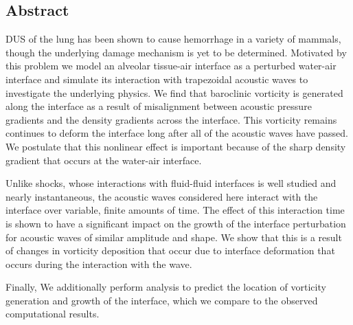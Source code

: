 \begin{center}
  \begin{minipage}{0.8\textwidth}
    \subsection*{Abstract}
    \ac{DUS} of the lung has been shown to cause hemorrhage in a
    variety of mammals, though the underlying damage mechanism is yet
    to be determined. Motivated by this problem we model an alveolar
    tissue-air interface as a perturbed water-air interface and
    simulate its interaction with trapezoidal acoustic waves to
    investigate the underlying physics. We find that baroclinic
    vorticity is generated along the interface as a result of
    misalignment between acoustic pressure gradients and the density
    gradients across the interface. This vorticity remains continues
    to deform the interface long after all of the acoustic waves have
    passed. We postulate that this nonlinear effect is important
    because of the sharp density gradient that occurs at the water-air
    interface.

    Unlike shocks, whose interactions with fluid-fluid interfaces is
    well studied and nearly instantaneous, the acoustic waves
    considered here interact with the interface over variable, finite
    amounts of time. The effect of this interaction time is shown to
    have a significant impact on the growth of the interface
    perturbation for acoustic waves of similar amplitude and shape. We
    show that this is a result of changes in vorticity deposition that
    occur due to interface deformation that occurs during the
    interaction with the
    wave.

    Finally, We additionally perform analysis to predict the location
    of vorticity generation and growth of the interface, which we
    compare to the observed computational results.
  \end{minipage}
\end{center}
